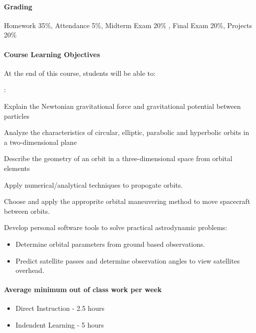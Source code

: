 \documentclass[10pt]{article}
\begin{document}
\paragraph*{Grading}
Homework 35\%,\;\; Attendance 5\%,\;\; Midterm Exam 20\% ,\;\; Final Exam 20\%, \;\; Projects 20\%


\paragraph*{Course Learning Objectives}
At the end of this course, students will be able to:

\begin{list}
{:}
{\setlength{\itemsep}{-3pt}}
\item Explain the Newtonian gravitational force and gravitational potential between particles
\item Analyze the characteristics of circular, elliptic, parabolic and hyperbolic orbits in a two-dimensional plane
\item Describe the geometry of an orbit in a three-dimensional space from orbital elements
\item Apply numerical/analytical techniques to propogate orbits.
\item Choose and apply the approprite orbital maneuvering method to move spacecraft between orbits.
\item Develop personal software tools to solve practical astrodynamic problems:
    \begin{itemize}
        \item Determine orbital parameters from ground based observations.
        \item Predict satellite passes and determine observation angles to view satellites overhead.
    \end{itemize}
\end{list}


\paragraph*{Average minimum out of class work per week}
\begin{itemize}
    \item Direct Instruction - 2.5 hours
    \item Indendent Learning - 5 hours
\end{itemize}
\end{document}
